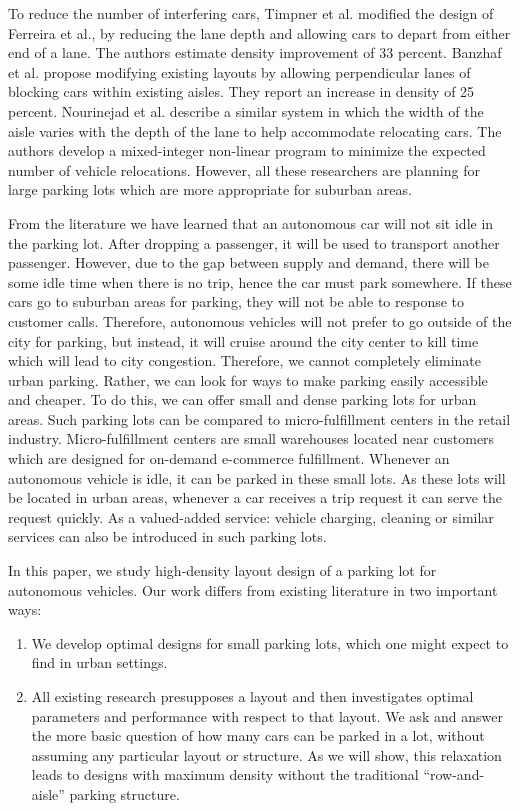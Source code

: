 To reduce the number of interfering cars, Timpner et al. modified the design of Ferreira et al., by reducing the lane depth and allowing cars to depart from either end of a lane. The authors estimate density improvement of 33 percent. Banzhaf et al. propose modifying existing layouts by allowing perpendicular lanes of blocking cars within existing aisles. They report an increase in density of 25 percent. Nourinejad et al. describe a similar system in which the width of the aisle varies with the depth of the lane to help accommodate relocating cars. The authors develop a mixed-integer non-linear program to minimize the expected number of vehicle relocations. However, all these researchers are planning for large parking lots which are more appropriate for suburban areas.

From the literature we have learned that an autonomous car will not sit idle in the parking lot. After dropping a passenger, it will be used to transport another passenger. However, due to the gap between supply and demand, there will be some idle time when there is no trip, hence the car must park somewhere. If these cars go to suburban areas for parking, they will not be able to response to customer calls. Therefore, autonomous vehicles will not prefer to go outside of the city for parking, but instead, it will cruise around the city center to kill time which will lead to city congestion. Therefore, we cannot completely eliminate urban parking. Rather, we can look for ways to make parking easily accessible and cheaper. To do this, we can offer small and dense parking lots for urban areas. Such parking lots can be compared to micro-fulfillment centers in the retail industry. Micro-fulfillment centers are small warehouses located near customers which are designed for on-demand e-commerce fulfillment. Whenever an autonomous vehicle is idle, it can be parked in these small lots. As these lots will be located in urban areas, whenever a car receives a trip request it can serve the request quickly. As a valued-added service: vehicle charging, cleaning or similar services can also be introduced in such parking lots.

In this paper, we study high-density layout design of a parking lot for autonomous vehicles. Our work differs from existing literature in two important ways:

\begin{enumerate}
    \item We develop optimal designs for small parking lots, which one might expect to find in urban settings.
    \item All existing research presupposes a layout and then investigates optimal parameters and performance with respect to that layout. We ask and answer the more basic question of how many cars can be parked in a lot, without assuming any particular layout or structure. As we will show, this relaxation leads to designs with maximum density without the traditional “row-and-aisle” parking structure.
\end{enumerate}

